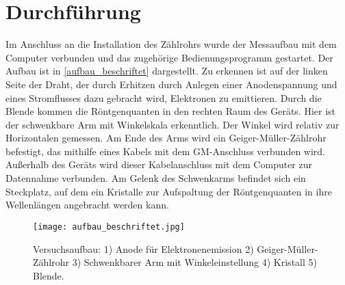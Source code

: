\section{Durchführung}




Im Anschluss an die Installation des Zählrohrs wurde der Messaufbau mit dem Computer verbunden und das zugehörige Bedienungsprogramm gestartet. Der Aufbau ist in \autoref{aufbau_beschriftet} dargestellt. Zu erkennen ist auf der linken Seite der Draht, der durch Erhitzen durch Anlegen einer Anodenspannung und eines Stromflusses dazu gebracht wird, Elektronen zu emittieren. Durch die Blende kommen die Röntgenquanten in den rechten Raum des Geräts. Hier ist der schwenkbare Arm mit Winkelskala erkenntlich. Der Winkel wird relativ zur Horizontalen gemessen. Am Ende des Arms wird ein Geiger-Müller-Zählrohr befestigt, das mithilfe eines Kabels mit dem GM-Anschluss verbunden wird. Außerhalb des Geräts wird dieser Kabelanschluss mit dem Computer zur Datennahme verbunden. Am Gelenk des Schwenkarms befindet sich ein Steckplatz, auf dem ein Kristalle zur Aufspaltung der Röntgenquanten in ihre Wellenlängen angebracht werden kann. 
\begin{figure}[H]
	\centering
	\texttt{[image: aufbau\_beschriftet.jpg]}
	\caption{Versuchsaufbau: 1) Anode für Elektronenemission 2) Geiger-Müller-Zählrohr 3) Schwenkbarer Arm mit Winkeleinstellung 4) Kristall 5) Blende.}
	\label{aufbau_beschriftet}
\end{figure}




